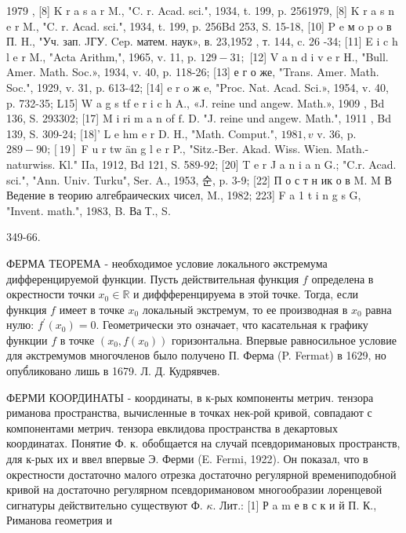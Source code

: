 \documentclass[10pt]{article}
\begin{document}
1979 , [8] K r a s a r M., "C. r. Acad. sci.", 1934, t. 199, p. 2561979, [8] K r a s n e r M., "C. r. Acad. sci.", 1934, t. 199, p. 256Bd 253, S. 15-18, [10] P e м o p o в П. H., "Уч. зап. JГУ. Cep. матем. наук», в. 23,1952 , т. 144, c. 26 -34; [11] E i c h l e r M., "Acta Arithm,", 1965, v. 11, p. $129-31 ;$ [12] V a n d i v e r H., "Bull. Amer. Math. Soc.», 1934, v. 40, p. 118-26; [13] е г о же, "Trans. Amer. Math. Soc.", 1929, v. 31, p. 613-42; [14] e r o ж e, "Proc. Nat. Acad. Sci.», 1954, v. 40, p. 732-35; L15] W a g s tf e r i c h A., «J. reine und angew. Math.», 1909 , Bd 136, S. 293302; [17] M i ri m a n of $\mathrm{f}$. D. "J. reine und angew. Math.", 1911 , Bd 139, S. 309-24; [18]' L e $\mathrm{hm}$ e r D. H., "Math. Comput.", $1981, v$ v. 36, p. $289-90 ;[19]$ F u r tw än g l e r P., "Sitz.-Ber. Akad. Wiss. Wien. Math.-naturwiss. Kl." IIa, 1912, Bd 121, S. 589-92; [20] T e r J a n i a n G.; "C.r. Acad. sci.", "Ann. Univ. Turku", Ser. A., 1953, 순, p. 3-9; [22] П о с т н ик о в M. M В Ведение в теорию алгебраических чисел, M., 1982; 223] F a 1 t i n g s G, "Invent. math.", 1983, B. Ва Т., S.

349-66.



ФЕРМА ТЕОРЕМА - необходимое условие локального әкстремума дифференцируемой функции. Пусть действительная функция $f$ определена в окрестности точки $x_{0} \in \mathbb{R}$ и диффференцируема в этой точке. Тогда, если функция $f$ имеет в точке $x_{0}$ локальный экстремум, то ее производная в $x_{0}$ равна нулю: $f^{\prime}\left(x_{0}\right)=0$. Геометрически это означает, что касательная к графику функции $f$ в точке $\left(x_{0}, f\left(x_{0}\right)\right)$ горизонтальна. Впервые равносильное условие для әкстремумов многочленов было получено П. Ферма (P. Fermat) в 1629, но опуб́ликовано лишь в 1679. Л. Д. Кудрявчев.



ФЕРМИ КООРДИНАТЫ - координаты, в к-рых компоненты метрич. тензора риманова пространства, вычисленные в точках нек-рой кривой, совпадают с компонентами метрич. тензора евклидова пространства в декартовых координатах. Понятие Ф. к. обобщается на случай псевдоримановых пространств, для к-рых их и ввел впервые Э. Ферми (E. Fermi, 1922). Он показал, что в окрестности достаточно малого отрезка достаточно регулярной времениподобной кривой на достаточно регулярном псевдоримановом многообразии лоренцевой сигнатуры действительно существуют Ф. $\kappa$. Лит.: [1] Р a m е в с к и й П. К., Риманова геометрия и
\end{document}
